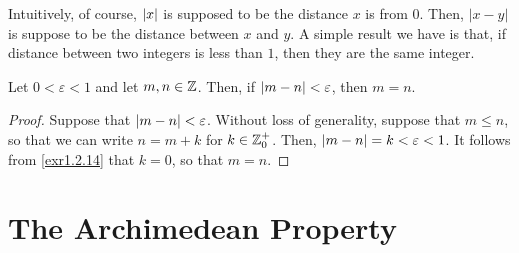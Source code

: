 Intuitively, of course, $\lvert x\rvert$ is supposed to be the distance $x$ is from $0$.  Then, $|x-y|$ is suppose to be the distance between $x$ and $y$.  A simple result we have is that, if distance between two integers is less than $1$, then they are the same integer.
\begin{prp}\label{prp3.2}
Let $0<\varepsilon <1$ and let $m,n\in \mathbb{Z}$.  Then, if $\lvert m-n\rvert<\varepsilon$, then $m=n$.
\begin{proof}
Suppose that $\lvert m-n\rvert<\varepsilon$.  Without loss of generality, suppose that $m\leq n$, so that we can write $n=m+k$ for $k\in \mathbb{Z} _0^+$.  Then, $\lvert m-n\rvert=k<\varepsilon <1$.  It follows from \cref{exr1.2.14} that $k=0$, so that $m=n$.
\end{proof}
\end{prp}

\section{The Archimedean Property}\label{sct3.2}

